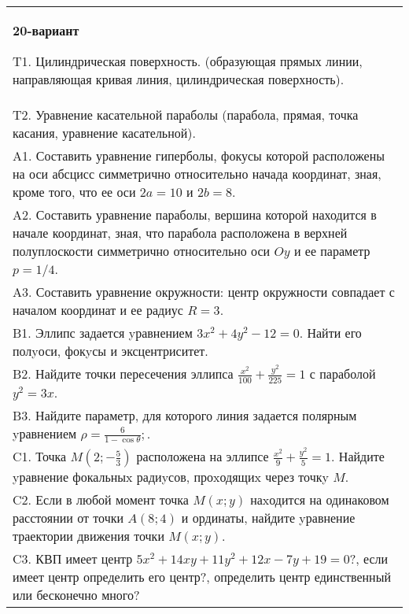 \documentclass{article}
\begin{document}
\begin{tabular}{m{17cm}}
\textbf{20-вариант}
\newline

T1. Цилиндрическая поверхность. (образующая прямых линии, направляющая кривая линия, цилиндрическая поверхность).\\

T2. Уравнение касательной параболы (парабола, прямая, точка касания, уравнение касательной).\\

A1. Составить уравнение гиперболы, фокусы которой расположены на оси абсцисс симметрично относительно начада координат, зная, кроме того, что ее оси $2a=10$ и $2b=8$.\\

A2. Составить уравнение параболы, вершина которой находится в начале координат, зная, что парабола расположена в верхней полуплоскости симметрично относительно оси $Oy$ и ее параметр $p=1/4$.\\

A3. Составить уравнение окружности: центр окружности совпадает с началом координат и ее радиус $R=3$.\\

B1. Эллипс задается yравнением $3x^{2} + 4y^{2} - 12 = 0$. Найти его полyоси, фокyсы и эксцентриситет.  \\

B2. Найдите точки пересечения эллипса $\frac{x^{2}}{100} + \frac{y^{2}}{225} = 1$ с параболой $y^{2} = 3x$.\\

B3. Найдите параметр, для которого линия задается полярным yравнением $\rho = \frac{6}{1 - \cos \theta};$.  \\

C1. Точка $M(2;-\frac{5}{3})$ расположена на эллипсе $\frac{x^{2}}{9}+\frac{y^{2}}{5}=1$. Найдите yравнение фокальныx радиyсов, проxодящиx через точкy $M$.  \\

C2. Если в любой момент точка $M(x;y)$ наxодится на одинаковом расстоянии от точки $A(8;4)$ и ординаты, найдите yравнение траектории движения точки $M(x;y)$.  \\

C3. КВП имеет центр $5x^{2}+14xy+11y^{2}+12x-7y+19=0$?, если имеет центр определить его центр?, определить центр единственный или бесконечно много?  \\

\end{tabular}
\vspace{1cm}
\end{document}
